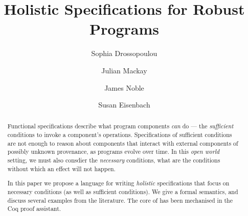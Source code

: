 \documentclass[runningheads]{llncs}
\begin{document}
\title{Holistic Specifications for Robust Programs}


\author{Sophia Drossopoulou \and
  Julian Mackay \and
  James Noble \and
  Susan Eisenbach}




\maketitle

\begin{abstract}
Functional specifications describe what
program components \emph{can} do --- the \emph{sufficient} conditions to
invoke a component's operations.
%
Specifications of sufficient conditions are not enough to reason about 
components that interact with external components of possibly unknown
provenance, as programs evolve over time. 
In this  \emph{open world} setting,
we must also consdier the
\emph{necessary} conditions, \ie
what are the conditions without which an effect will not happen. 


In this paper we
 propose a 
 language \Chainmail for writing \emph{holistic} specifications that
 focus on necessary conditions (as well as sufficient conditions). We give a formal semantics, and discuss several
 examples from the literature.
The core of \Chainmail has been
  mechanised in the Coq proof assistant.
\end{abstract}
\end{document}
